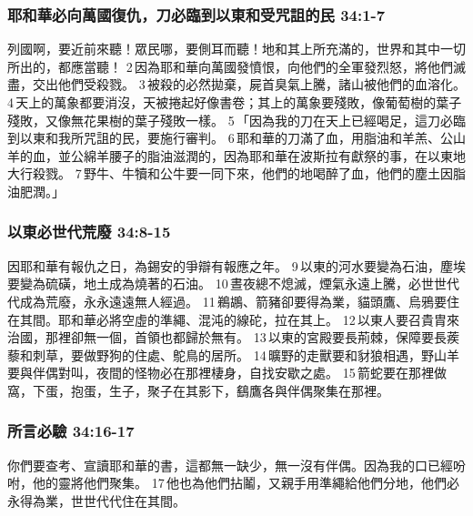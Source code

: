 \subsubsection{耶和華必向萬國復仇，刀必臨到以東和受咒詛的民 34:1-7}
列國啊，要近前來聽！眾民哪，要側耳而聽！地和其上所充滿的，世界和其中一切所出的，都應當聽！ 2 因為耶和華向萬國發憤恨，向他們的全軍發烈怒，將他們滅盡，交出他們受殺戮。 3 被殺的必然拋棄，屍首臭氣上騰，諸山被他們的血溶化。 4 天上的萬象都要消沒，天被捲起好像書卷；其上的萬象要殘敗，像葡萄樹的葉子殘敗，又像無花果樹的葉子殘敗一樣。 5 「因為我的刀在天上已經喝足，這刀必臨到以東和我所咒詛的民，要施行審判。 6 耶和華的刀滿了血，用脂油和羊羔、公山羊的血，並公綿羊腰子的脂油滋潤的，因為耶和華在波斯拉有獻祭的事，在以東地大行殺戮。 7 野牛、牛犢和公牛要一同下來，他們的地喝醉了血，他們的塵土因脂油肥潤。」

\subsubsection{以東必世代荒廢 34:8-15}
因耶和華有報仇之日，為錫安的爭辯有報應之年。 9 以東的河水要變為石油，塵埃要變為硫磺，地土成為燒著的石油。 10 晝夜總不熄滅，煙氣永遠上騰，必世世代代成為荒廢，永永遠遠無人經過。 11 鵜鶘、箭豬卻要得為業，貓頭鷹、烏鴉要住在其間。耶和華必將空虛的準繩、混沌的線砣，拉在其上。 12 以東人要召貴胄來治國，那裡卻無一個，首領也都歸於無有。 13 以東的宮殿要長荊棘，保障要長蒺藜和刺草，要做野狗的住處、鴕鳥的居所。 14 曠野的走獸要和豺狼相遇，野山羊要與伴偶對叫，夜間的怪物必在那裡棲身，自找安歇之處。 15 箭蛇要在那裡做窩，下蛋，抱蛋，生子，聚子在其影下，鷂鷹各與伴偶聚集在那裡。

\subsubsection{所言必驗 34:16-17}
你們要查考、宣讀耶和華的書，這都無一缺少，無一沒有伴偶。因為我的口已經吩咐，他的靈將他們聚集。 17 他也為他們拈鬮，又親手用準繩給他們分地，他們必永得為業，世世代代住在其間。


